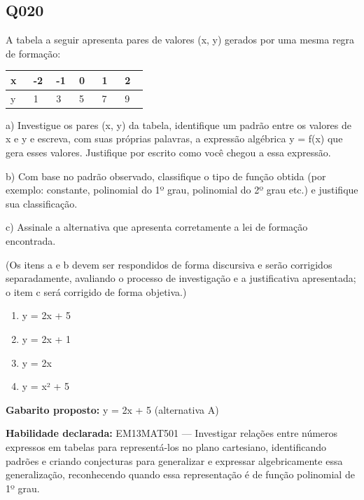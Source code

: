 \documentclass[11pt,a4paper]{article}
\begin{document}
\begin{samepage}
\subsection*{Q020}
A tabela a seguir apresenta pares de valores (x, y) gerados por uma mesma regra de formação:

\begin{center}
\begin{tabular}{|p{0.143\linewidth}|p{0.143\linewidth}|p{0.143\linewidth}|p{0.143\linewidth}|p{0.143\linewidth}|p{0.143\linewidth}|}
\hline
\textbf{x} & \textbf{-2} & \textbf{-1} & \textbf{0} & \textbf{1} & \textbf{2} \\
\hline
y & 1 & 3 & 5 & 7 & 9 \\
\hline
\end{tabular}
\end{center}

a) Investigue os pares (x, y) da tabela, identifique um padrão entre os valores de x e y e escreva, com suas próprias palavras, a expressão algébrica y = f(x) que gera esses valores. Justifique por escrito como você chegou a essa expressão.

b) Com base no padrão observado, classifique o tipo de função obtida (por exemplo: constante, polinomial do 1º grau, polinomial do 2º grau etc.) e justifique sua classificação.

c) Assinale a alternativa que apresenta corretamente a lei de formação encontrada.

(Os itens a e b devem ser respondidos de forma discursiva e serão corrigidos separadamente, avaliando o processo de investigação e a justificativa apresentada; o item c será corrigido de forma objetiva.)
\begin{enumerate}[label=(\alph*),nosep,leftmargin=*]
\item y = 2x + 5
\item y = 2x + 1
\item y = 2x
\item y = x² + 5
\end{enumerate}

\textbf{Gabarito proposto:} y = 2x + 5 (alternativa A)

\textbf{Habilidade declarada:} EM13MAT501 --- Investigar relações entre números expressos em tabelas para representá-los no plano cartesiano, identificando padrões e criando conjecturas para generalizar e expressar algebricamente essa generalização, reconhecendo quando essa representação é de função polinomial de 1º grau.
\end{samepage}
\end{document}
